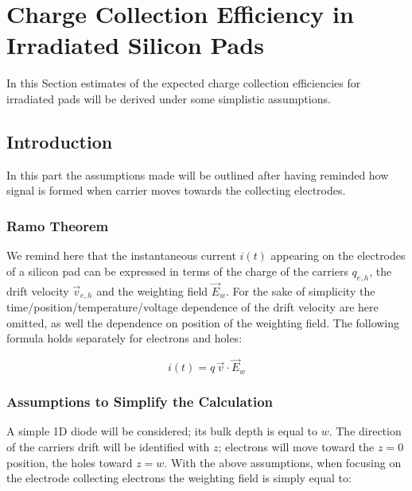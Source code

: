 


\chapter{Charge Collection Efficiency in Irradiated Silicon Pads}
\label{sec:CCEirr}

In this Section estimates of the expected charge collection efficiencies 
for irradiated pads will be derived under some simplistic assumptions.

\section{Introduction}
In this part the assumptions made will be outlined after having reminded how signal is formed when 
carrier moves towards the collecting electrodes.
\subsection{Ramo Theorem}
\label{sec:CCEramo}
We remind here that the instantaneous current $i(t)$ appearing on the electrodes of a silicon pad can be expressed 
in terms of the charge of the carriers $q_{e,h}$, the drift velocity $\vec{v}_{e,h}$  and the 
weighting field $\vec{E}_w$. For the sake of simplicity the time/position/temperature/voltage 
dependence of the drift velocity are here omitted, as well the dependence on position of the 
weighting field.
The following formula holds separately for electrons and holes:

\begin{equation}
i(t) = q\,\vec{v}\cdot\vec{E}_w
\end{equation} 

\subsection{Assumptions to Simplify the Calculation}
\label{sec:assumptions}
A simple 1D diode will be considered; its bulk depth is equal to $w$. The direction of the carriers 
drift will be identified with $z$; electrons will move toward the $z=0$ position, the holes toward $z=w$.
With the above assumptions, when focusing on the electrode collecting electrons 
the weighting field is simply equal to:

